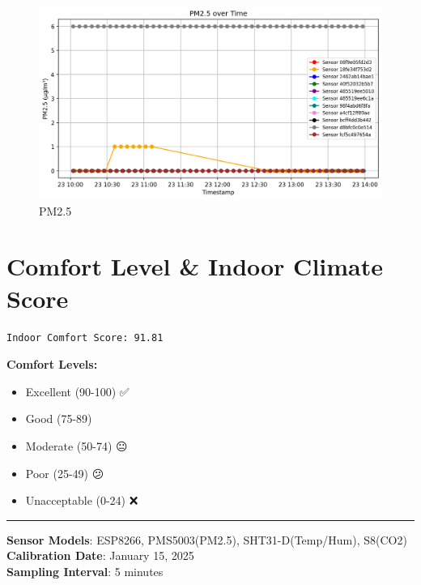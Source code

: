 \documentclass[
  12pt,
  letterpaper,
]{article}
\providecommand{\tightlist}{%
  \setlength{\itemsep}{0pt}\setlength{\parskip}{0pt}}\usepackage{longtable,booktabs,array}
\begin{document}
\begin{figure}[H]

{\centering \includegraphics[width=0.85\linewidth,height=\textheight,keepaspectratio]{./charts/pm_chart.png}

}

\caption{PM2.5}

\end{figure}%

\section{Comfort Level \& Indoor Climate
Score}\label{comfort-level-indoor-climate-score}

\begin{verbatim}
Indoor Comfort Score: 91.81
\end{verbatim}

\textbf{Comfort Levels:}

\begin{itemize}
\tightlist
\item
  Excellent (90-100) ✅
\item
  Good (75-89) 🙂
\item
  Moderate (50-74) 😐
\item
  Poor (25-49) 😕
\item
  Unacceptable (0-24) ❌
\end{itemize}

\begin{center}\rule{0.5\linewidth}{0.5pt}\end{center}

\textbf{Sensor Models}: ESP8266, PMS5003(PM2.5), SHT31-D(Temp/Hum),
S8(CO2)\\
\textbf{Calibration Date}: January 15, 2025\\
\textbf{Sampling Interval}: 5 minutes
\end{document}
